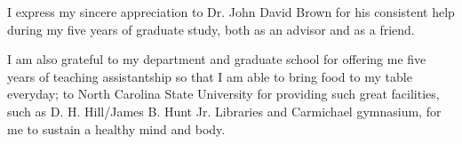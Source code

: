 \begin{acknowledgements}
I express my sincere appreciation to  Dr. John David Brown for his consistent help during my five years of graduate study, both as an advisor and as a friend. 

I am also grateful to my department and graduate school for offering me five years of teaching assistantship so that I am able to bring food to my table everyday; to North Carolina State University for providing such great facilities, such as D. H. Hill/James B. Hunt Jr. Libraries and Carmichael gymnasium, for me to sustain a healthy mind and body. 
\end{acknowledgements}


\thesistableofcontents


\thesislistoffigures
